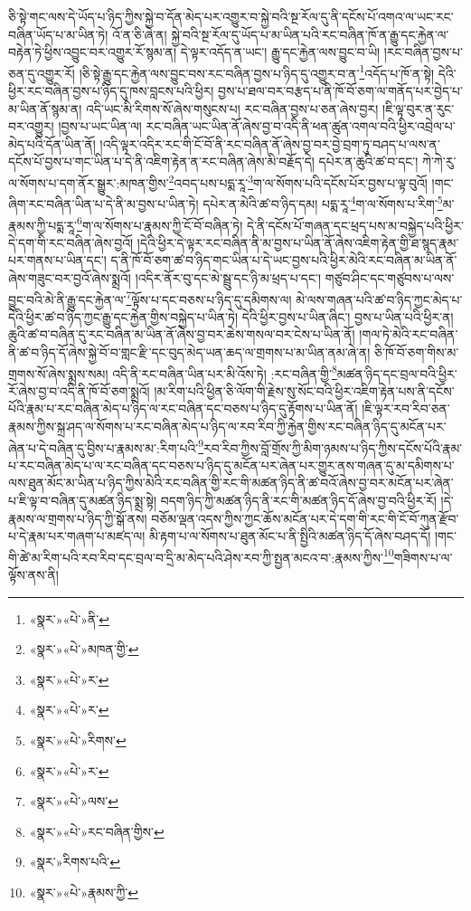 ཅི་སྟེ་གང་ལས་དེ་ཡོད་པ་ཉིད་ཀྱིས་སྐྱེ་བ་དོན་མེད་པར་འགྱུར་བ་སྐྱེ་བའི་སྔ་རོལ་དུ་ནི་དངོས་པོ་འགའ་ལ་ཡང་རང་བཞིན་ཡོད་པ་མ་ཡིན་ཏེ། འོ་ན་ཅི་ཞེ་ན། སྐྱེ་བའི་སྔ་རོལ་དུ་ཡོད་པ་མ་ཡིན་པའི་རང་བཞིན་ཁོ་ན་རྒྱུ་དང་རྐྱེན་ལ་བརྟེན་ཏེ་ཕྱིས་འབྱུང་བར་འགྱུར་རོ་སྙམ་ན། དེ་ལྟར་འདོད་ན་ཡང་། རྒྱུ་དང་རྐྱེན་ལས་བྱུང་བ་ཡི། །རང་བཞིན་བྱས་པ་ཅན་དུ་འགྱུར་རོ། །ཅི་སྟེ་རྒྱུ་དང་རྐྱེན་ལས་བྱུང་བས་རང་བཞིན་བྱས་པ་ཉིད་དུ་འགྱུར་བ་ན་\footnote{«སྣར་»«པེ་»ནི་}འདོད་པ་ཁོ་ན་སྟེ། དེའི་ཕྱིར་རང་བཞིན་བྱས་པ་ཉིད་དུ་ཁས་བླངས་པའི་ཕྱིར། བྱས་པ་ཐལ་བར་བརྩད་པ་ནི་ཁོ་བོ་ཅག་ལ་གནོད་པར་བྱེད་པ་མ་ཡིན་ནོ་སྙམ་ན། འདི་ཡང་མི་རིགས་སོ་ཞེས་གསུངས་པ། རང་བཞིན་བྱས་པ་ཅན་ཞེས་བྱར། །ཇི་ལྟ་བུར་ན་རུང་བར་འགྱུར། །བྱས་པ་ཡང་ཡིན་ལ། རང་བཞིན་ཡང་ཡིན་ནོ་ཞེས་བྱ་བ་འདི་ནི་ཕན་ཚུན་འགལ་བའི་ཕྱིར་འབྲེལ་པ་མེད་པའི་དོན་ཡིན་ནོ། །འདི་ལྟར་འདིར་རང་གི་ངོ་བོ་ནི་རང་བཞིན་ནོ་ཞེས་བྱ་བར་བྱེ་བྲག་ཏུ་བཤད་པ་ལས་ན་དངོས་པོ་བྱས་པ་གང་ཡིན་པ་དེ་ནི་འཇིག་རྟེན་ན་རང་བཞིན་ཞེས་མི་བརྗོད་དེ། དཔེར་ན་ཆུའི་ཚ་བ་དང་། ཀེ་ཀེ་རུ་ལ་སོགས་པ་དག་ནོར་སྒྱུར་:མཁན་གྱིས་\footnote{«སྣར་»«པེ་»མཁན་གྱི་}འབད་པས་པདྨ་རཱ་\footnote{«སྣར་»«པེ་»ར་}ག་ལ་སོགས་པའི་དངོས་པོར་བྱས་པ་ལྟ་བུའོ། །གང་ཞིག་རང་བཞིན་ཡིན་པ་དེ་ནི་མ་བྱས་པ་ཡིན་ཏེ། དཔེར་ན་མེའི་ཚ་བ་ཉིད་དམ། པདྨ་རཱ་\footnote{«སྣར་»«པེ་»ར་}ག་ལ་སོགས་པ་རིག་\footnote{«སྣར་»«པེ་»རིགས་}མ་རྣམས་ཀྱི་པདྨ་རཱ་\footnote{«སྣར་»«པེ་»ར་}ག་ལ་སོགས་པ་རྣམས་ཀྱི་ངོ་བོ་བཞིན་ཏེ། དེ་ནི་དངོས་པོ་གཞན་དང་ཕྲད་པས་མ་བསྐྱེད་པའི་ཕྱིར་དེ་དག་གི་རང་བཞིན་ཞེས་བྱའོ། །དེའི་ཕྱིར་དེ་ལྟར་རང་བཞིན་ནི་མ་བྱས་པ་ཡིན་ནོ་ཞེས་འཇིག་རྟེན་གྱི་ཐ་སྙད་རྣམ་པར་གནས་པ་ཡིན་དང་། ད་ནི་ཁོ་བོ་ཅག་ཚ་བ་ཉིད་གང་ཡིན་པ་དེ་ཡང་བྱས་པའི་ཕྱིར་མེའི་རང་བཞིན་མ་ཡིན་ནོ་ཞེས་གཟུང་བར་བྱའོ་ཞེས་སྨྲའོ། །འདིར་ནོར་བུ་དང་མེ་སྦྲུ་དང་ཉི་མ་ཕྲད་པ་དང་། གཙུབ་ཤིང་དང་གཙུབས་པ་ལས་བྱུང་བའི་མེ་ནི་རྒྱུ་དང་རྐྱེན་ལ་\footnote{«སྣར་»«པེ་»ལས་}ལྟོས་པ་དང་བཅས་པ་ཉིད་དུ་དམིགས་ལ། མེ་ལས་གཞན་པའི་ཚ་བ་ཉིད་ཀྱང་མེད་པ་དེའི་ཕྱིར་ཚ་བ་ཉིད་ཀྱང་རྒྱུ་དང་རྐྱེན་གྱིས་བསྐྱེད་པ་ཡིན་ཏེ། དེའི་ཕྱིར་བྱས་པ་ཡིན་ཞིང་། བྱས་པ་ཡིན་པའི་ཕྱིར་ན། ཆུའི་ཚ་བ་བཞིན་དུ་རང་བཞིན་མ་ཡིན་ནོ་ཞེས་བྱ་བར་ཆེས་གསལ་བར་ངེས་པ་ཡིན་ནོ། །གལ་ཏེ་མེའི་རང་བཞིན་ནི་ཚ་བ་ཉིད་དོ་ཞེས་སྐྱེ་བོ་བ་གླང་རྫི་དང་བུད་མེད་ཡན་ཆད་ལ་གྲགས་པ་མ་ཡིན་ནམ་ཞེ་ན། ཅི་ཁོ་བོ་ཅག་གིས་མ་གྲགས་སོ་ཞེས་སྨྲས་སམ། འདི་ནི་རང་བཞིན་ཡིན་པར་མི་འོས་ཏེ། :རང་བཞིན་གྱི་\footnote{«སྣར་»«པེ་»རང་བཞིན་གྱིས་}མཚན་ཉིད་དང་བྲལ་བའི་ཕྱིར་རོ་ཞེས་བྱ་བ་འདི་ནི་ཁོ་བོ་ཅག་སྨྲའོ། །མ་རིག་པའི་ཕྱིན་ཅི་ལོག་གི་རྗེས་སུ་སོང་བའི་ཕྱིར་འཇིག་རྟེན་པས་ནི་དངོས་པོའི་རྣམ་པ་རང་བཞིན་མེད་པ་ཉིད་ལ་རང་བཞིན་དང་བཅས་པ་ཉིད་དུ་རྟོགས་པ་ཡིན་ནོ། །ཇི་ལྟར་རབ་རིབ་ཅན་རྣམས་ཀྱིས་སྐྲ་ཤད་ལ་སོགས་པ་རང་བཞིན་མེད་པ་ཉིད་ལ་རབ་རིབ་ཀྱི་རྐྱེན་གྱིས་རང་བཞིན་ཉིད་དུ་མངོན་པར་ཞེན་པ་དེ་བཞིན་དུ་བྱིས་པ་རྣམས་མ་:རིག་པའི་\footnote{«སྣར་»རིགས་པའི་}རབ་རིབ་ཀྱིས་བློ་གྲོས་ཀྱི་མིག་ཉམས་པ་ཉིད་ཀྱིས་དངོས་པོའི་རྣམ་པ་རང་བཞིན་མེད་པ་ལ་རང་བཞིན་དང་བཅས་པ་ཉིད་དུ་མངོན་པར་ཞེན་པར་གྱུར་ནས་གཞན་དུ་མ་དམིགས་པ་ལས་ཐུན་མོང་མ་ཡིན་པ་ཉིད་ཀྱིས་མེའི་རང་བཞིན་གྱི་རང་གི་མཚན་ཉིད་ནི་ཚ་བའོ་ཞེས་བྱ་བར་མངོན་པར་ཞེན་པ་ཇི་ལྟ་བ་བཞིན་དུ་མཚན་ཉིད་སྨྲ་སྟེ། བདག་ཉིད་ཀྱི་མཚན་ཉིད་ནི་རང་གི་མཚན་ཉིད་དོ་ཞེས་བྱ་བའི་ཕྱིར་རོ། །དེ་རྣམས་ལ་གྲགས་པ་ཉིད་ཀྱི་སྒོ་ནས། བཅོམ་ལྡན་འདས་ཀྱིས་ཀྱང་ཆོས་མངོན་པར་དེ་དག་གི་རང་གི་ངོ་བོ་ཀུན་རྫོབ་པ་དེ་རྣམ་པར་གཞག་པ་མཛད་ལ། མི་རྟག་པ་ལ་སོགས་པ་ཐུན་མོང་པ་ནི་སྤྱིའི་མཚན་ཉིད་དོ་ཞེས་བཤད་དོ། །གང་གི་ཚེ་མ་རིག་པའི་རབ་རིབ་དང་བྲལ་བ་དྲི་མ་མེད་པའི་ཤེས་རབ་ཀྱི་སྤྱན་མངའ་བ་:རྣམས་ཀྱིས་\footnote{«སྣར་»«པེ་»རྣམས་ཀྱི་}གཟིགས་པ་ལ་ལྟོས་ནས་ནི། 